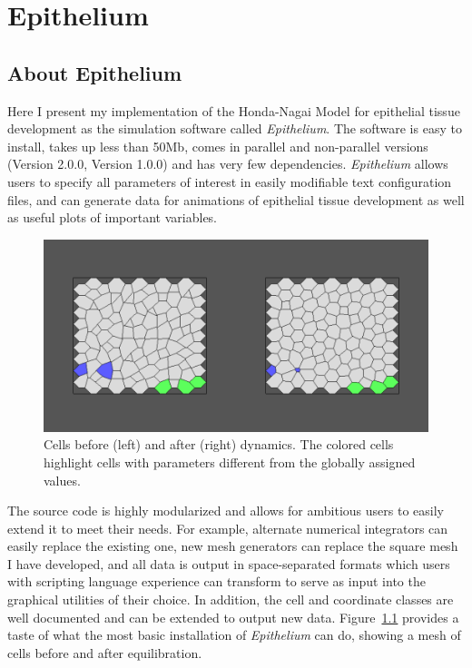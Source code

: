 \chapter{Epithelium}
\label{chap:Epithelium}
\section{About Epithelium}
Here I present my implementation of the Honda-Nagai Model for epithelial tissue development as the simulation software called \emph{Epithelium}. The software is easy to install, takes up less than 50Mb, comes in parallel and non-parallel versions (Version 2.0.0, Version 1.0.0) and has very few dependencies. \emph{Epithelium} allows users to specify all parameters of interest in easily modifiable text configuration files, and can generate data for animations of epithelial tissue development as well as useful plots of important variables. 

\begin{figure}
\centering
\includegraphics[width=\textwidth]{../diagrams/BeforeAfter.png}
\caption[Cells before and after dynamics]{Cells before (left) and after (right) dynamics. The colored cells highlight cells with parameters different from the globally assigned values.}
\label{fig:beforeafter}
\end{figure}

The source code is highly modularized and allows for ambitious users to easily extend it to meet their needs. For example, alternate numerical integrators can easily replace the existing one, new mesh generators can replace the square mesh I have developed, and all data is output in space-separated formats which users with scripting language experience can transform to serve as input into the graphical utilities of their choice. In addition, the cell and coordinate classes are well documented and can be extended to output new data. Figure~\ref{fig:beforeafter} provides a taste of what the most basic installation of \emph{Epithelium} can do, showing a mesh of cells before and after equilibration.


